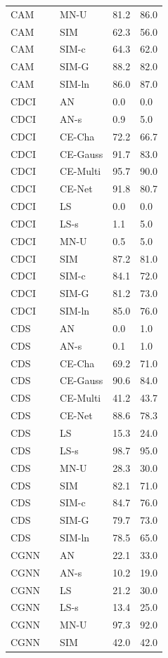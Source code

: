 \begin{tabular}{lllll}
CAM &  & MN-U & 81.2 & 86.0 \\
CAM &  & SIM & 62.3 & 56.0 \\
CAM &  & SIM-c & 64.3 & 62.0 \\
CAM &  & SIM-G & 88.2 & 82.0 \\
CAM &  & SIM-ln & 86.0 & 87.0 \\
CDCI &  & AN & 0.0 & 0.0 \\
CDCI &  & AN-s & 0.9 & 5.0 \\
CDCI &  & CE-Cha & 72.2 & 66.7 \\
CDCI &  & CE-Gauss & 91.7 & 83.0 \\
CDCI &  & CE-Multi & 95.7 & 90.0 \\
CDCI &  & CE-Net & 91.8 & 80.7 \\
CDCI &  & LS & 0.0 & 0.0 \\
CDCI &  & LS-s & 1.1 & 5.0 \\
CDCI &  & MN-U & 0.5 & 5.0 \\
CDCI &  & SIM & 87.2 & 81.0 \\
CDCI &  & SIM-c & 84.1 & 72.0 \\
CDCI &  & SIM-G & 81.2 & 73.0 \\
CDCI &  & SIM-ln & 85.0 & 76.0 \\
CDS &  & AN & 0.0 & 1.0 \\
CDS &  & AN-s & 0.1 & 1.0 \\
CDS &  & CE-Cha & 69.2 & 71.0 \\
CDS &  & CE-Gauss & 90.6 & 84.0 \\
CDS &  & CE-Multi & 41.2 & 43.7 \\
CDS &  & CE-Net & 88.6 & 78.3 \\
CDS &  & LS & 15.3 & 24.0 \\
CDS &  & LS-s & 98.7 & 95.0 \\
CDS &  & MN-U & 28.3 & 30.0 \\
CDS &  & SIM & 82.1 & 71.0 \\
CDS &  & SIM-c & 84.7 & 76.0 \\
CDS &  & SIM-G & 79.7 & 73.0 \\
CDS &  & SIM-ln & 78.5 & 65.0 \\
CGNN &  & AN & 22.1 & 33.0 \\
CGNN &  & AN-s & 10.2 & 19.0 \\
CGNN &  & LS & 21.2 & 30.0 \\
CGNN &  & LS-s & 13.4 & 25.0 \\
CGNN &  & MN-U & 97.3 & 92.0 \\
CGNN &  & SIM & 42.0 & 42.0 \\

\end{tabular}
